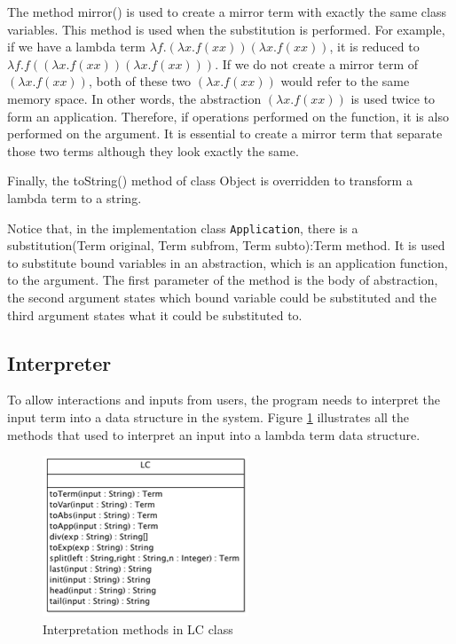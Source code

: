 \documentclass[a4paper,11pt,twoside]{report}
\begin{document}
The method \textsf{mirror()} is used to create a mirror term with exactly the same class variables. This method is used when the substitution is performed. For example, if we have a lambda term $\lambda f.(\lambda x.f(xx))(\lambda x.f(xx))$, it is reduced to $\lambda f.f((\lambda x.f(xx))(\lambda x.f(xx)))$. If we do not create a mirror term of $(\lambda x.f(xx))$, both of these two $(\lambda x.f(xx))$ would refer to the same memory space. In other words, the abstraction $(\lambda x.f(xx))$ is used twice to form an application. Therefore, if operations performed on the function, it is also performed on the argument. It is essential to create a mirror term that separate those two terms although they look exactly the same.      

Finally, the \textsf{toString()} method of class \textsf{Object} is overridden to transform a lambda term to a string. 

Notice that, in the implementation class \verb|Application|, there is a \textsf{substitution(Term original, Term subfrom, Term subto):Term} method. It is used to substitute bound variables in an abstraction, which is an application function, to the argument. The first parameter of the method is the body of abstraction, the second argument states which bound variable could be substituted and the third argument states what it could be substituted to.

\subsection{Interpreter}
To allow interactions and inputs from users, the program needs to interpret the input term into a data structure in the system. Figure \ref{fig:inter} illustrates all the methods that used to interpret an input into a lambda term data structure.   

\begin{figure}[ht]
\centering
\includegraphics[scale=0.6]{LC}
\caption{Interpretation methods in LC class}
\label{fig:inter}
\end{figure}
\end{document}
